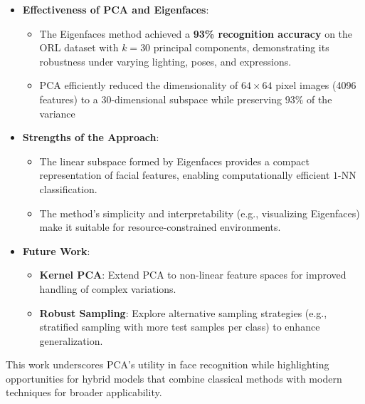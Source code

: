 \documentclass{article}
\begin{document}
	\begin{itemize}
		\item \textbf{Effectiveness of PCA and Eigenfaces}:
		\begin{itemize}
			\item The Eigenfaces method achieved a \textbf{93\% recognition accuracy} on the ORL dataset with \(k = 30\) principal components, demonstrating its robustness under varying lighting, poses, and expressions.
			\item PCA efficiently reduced the dimensionality of \(64 \times 64\) pixel images (4096 features) to a \(30\)-dimensional subspace while preserving \(93\%\) of the variance
		\end{itemize}
		
		\item \textbf{Strengths of the Approach}:
		\begin{itemize}
			\item The linear subspace formed by Eigenfaces provides a compact representation of facial features, enabling computationally efficient \(1\)-NN classification.
			\item The method’s simplicity and interpretability (e.g., visualizing Eigenfaces) make it suitable for resource-constrained environments.
		\end{itemize}
	
		\item \textbf{Future Work}:
		\begin{itemize}
			\item \textbf{Kernel PCA}: Extend PCA to non-linear feature spaces for improved handling of complex variations.
			\item \textbf{Robust Sampling}: Explore alternative sampling strategies (e.g., stratified sampling with more test samples per class) to enhance generalization.
		\end{itemize}
	\end{itemize}
	
	This work underscores PCA’s utility in face recognition while highlighting opportunities for hybrid models that combine classical methods with modern techniques for broader applicability.
\end{document}
